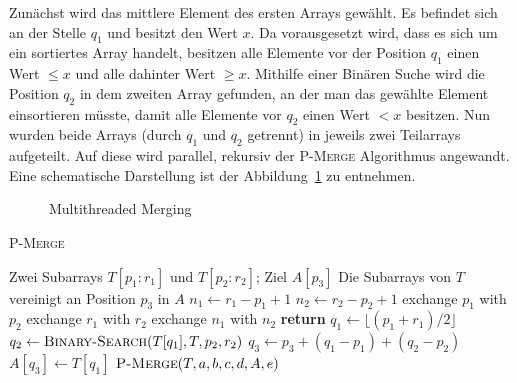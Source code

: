 Zunächst wird das mittlere Element des ersten Arrays gewählt.
Es befindet sich an der Stelle $q_1$ und besitzt den Wert $x$.
Da vorausgesetzt wird, dass es sich um ein sortiertes Array handelt, besitzen
alle Elemente vor der Position $q_1$ einen Wert $\leq x$ und alle dahinter
Wert $\geq x$.
Mithilfe einer Binären Suche wird die Position $q_2$ in dem zweiten Array
gefunden, an der man das gewählte Element einsortieren müsste, damit alle
Elemente vor $q_2$ einen Wert $< x$ besitzen.
Nun wurden beide Arrays (durch $q_1$ und $q_2$ getrennt) in jeweils zwei
Teilarrays aufgeteilt.
Auf diese wird parallel, rekursiv der \textsc{P-Merge} Algorithmus angewandt.
Eine schematische Darstellung ist der Abbildung~\ref{fig:p-merge} zu entnehmen.

\begin{figure}
    \centering
    
    \caption{Multithreaded Merging \cite[S.798]{cormen}}
    \label{fig:p-merge}
\end{figure}

\begin{algorithm}
    \caption{\textsc{P-Merge} \cite[S.800]{cormen}}
    \label{alg:p-merge}
    \begin{algorithmic}[1]
        \Require Zwei Subarrays $T[p_1:r_1]$ und $T[p_2:r_2]$;
            Ziel $A[p_3]$
        \Ensure Die Subarrays von $T$ vereinigt an Position $p_3$ in $A$
        \State $n_1 \gets r_1 - p_1 + 1$
        \State $n_2 \gets r_2 - p_2 + 1$
            \State exchange $p_1$ with $p_2$
            \State exchange $r_1$ with $r_2$
            \State exchange $n_1$ with $n_2$
        \EndIf
            \State \textbf{return}
        \Else
            \State $q_1 \gets \lfloor ( p_1 + r_1 ) / 2 \rfloor$
            \State $q_2 \gets \textsc{Binary-Search}(T[q_1], T, p_2, r_2)$
            \State $q_3 \gets p_3 + (q_1 - p_1) + (q_2 - p_2)$
            \State $A[q_3] \gets T[q_1]$
                \State $\textsc{P-Merge}(T,a, b, c, d, A, e)$
            \EndParDo
        \EndIf
    \end{algorithmic}
\end{algorithm}

